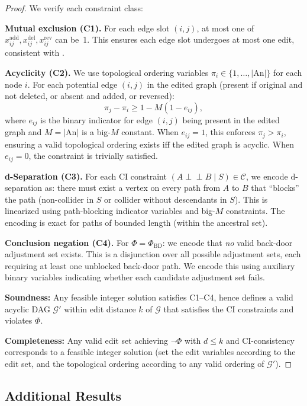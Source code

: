 \documentclass[11pt,a4paper]{article}
\theoremstyle{definition}
\theoremstyle{remark}
\newcommand{\CI}{\perp\!\!\!\perp}
\newcommand{\DAG}{\mathcal{G}}
\newcommand{\An}{\mathrm{An}}
\newcommand{\editdist}{d}
\newcommand{\Phi}{\varPhi}
\begin{document}
\begin{proof}
We verify each constraint class:

\textbf{Mutual exclusion (C1).} For each edge slot $(i,j)$, at most one of
$x_{ij}^{\mathrm{add}}, x_{ij}^{\mathrm{del}}, x_{ij}^{\mathrm{rev}}$ can be~1. This
ensures each edge slot undergoes at most one edit, consistent with .

\textbf{Acyclicity (C2).} We use topological ordering variables
$\pi_i \in \{1, \ldots, |\An|\}$ for each node $i$. For each potential edge $(i,j)$ in
the edited graph (present if original and not deleted, or absent and added, or reversed):
\[
  \pi_j - \pi_i \geq 1 - M(1 - e_{ij}),
\]
where $e_{ij}$ is the binary indicator for edge $(i,j)$ being present in the edited
graph and $M = |\An|$ is a big-$M$ constant. When $e_{ij} = 1$, this enforces
$\pi_j > \pi_i$, ensuring a valid topological ordering exists iff the edited graph is
acyclic. When $e_{ij} = 0$, the constraint is trivially satisfied.

\textbf{d-Separation (C3).} For each CI constraint $(A \CI B \mid S) \in \mathcal{C}$,
we encode d-separation as: there must exist a vertex on every path from $A$ to $B$ that
``blocks'' the path (non-collider in $S$ or collider without descendants in $S$). This is
linearized using path-blocking indicator variables and big-$M$ constraints. The encoding
is exact for paths of bounded length (within the ancestral set).

\textbf{Conclusion negation (C4).} For $\Phi = \Phi_{\mathrm{BD}}$: we encode that
\emph{no} valid back-door adjustment set exists. This is a disjunction over all possible
adjustment sets, each requiring at least one unblocked back-door path. We encode this
using auxiliary binary variables indicating whether each candidate adjustment set fails.

\textbf{Soundness:} Any feasible integer solution satisfies C1--C4, hence defines a
valid acyclic DAG $\DAG'$ within edit distance $k$ of $\DAG$ that satisfies the CI
constraints and violates $\Phi$.

\textbf{Completeness:} Any valid edit set achieving $\neg\Phi$ with $\editdist \leq k$
and CI-consistency corresponds to a feasible integer solution (set the edit variables
according to the edit set, and the topological ordering according to any valid ordering
of $\DAG'$).
\end{proof}

\subsection{Additional Results}
\end{document}
